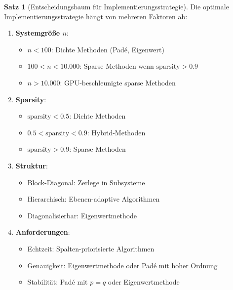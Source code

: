 ﻿\documentclass[a4paper,12pt]{report}
\theoremstyle{definition}
\newtheorem{satz}{Satz}
\begin{document}
	\begin{satz}[Entscheidungsbaum für Implementierungsstrategie]
		Die optimale Implementierungsstrategie hängt von mehreren Faktoren ab:
		
		\begin{enumerate}
			\item \textbf{Systemgröße $n$}:
			\begin{itemize}
				\item $n < 100$: Dichte Methoden (Padé, Eigenwert)
				\item $100 < n < 10.000$: Sparse Methoden wenn $\text{sparsity} > 0.9$
				\item $n > 10.000$: GPU-beschleunigte sparse Methoden
			\end{itemize}
			
			\item \textbf{Sparsity}:
			\begin{itemize}
				\item $\text{sparsity} < 0.5$: Dichte Methoden
				\item $0.5 < \text{sparsity} < 0.9$: Hybrid-Methoden
				\item $\text{sparsity} > 0.9$: Sparse Methoden
			\end{itemize}
			
			\item \textbf{Struktur}:
			\begin{itemize}
				\item Block-Diagonal: Zerlege in Subsysteme
				\item Hierarchisch: Ebenen-adaptive Algorithmen
				\item Diagonalisierbar: Eigenwertmethode
			\end{itemize}
			
			\item \textbf{Anforderungen}:
			\begin{itemize}
				\item Echtzeit: Spalten-priorisierte Algorithmen
				\item Genauigkeit: Eigenwertmethode oder Padé mit hoher Ordnung
				\item Stabilität: Padé mit $p = q$ oder Eigenwertmethode
			\end{itemize}
		\end{enumerate}
	\end{satz}
	
\end{document}
